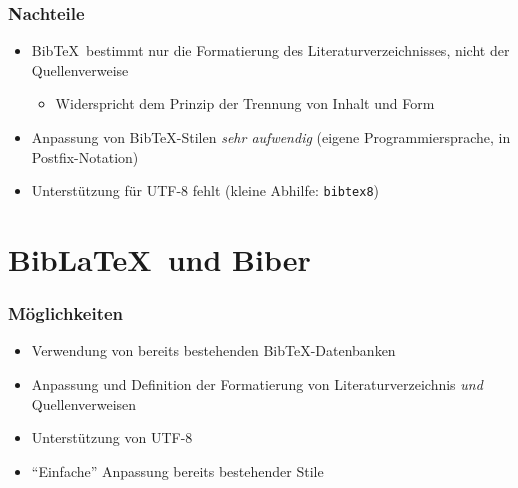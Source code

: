 \begin{frame}
  \frametitle{Nachteile}
  \onslide<+->

  \begin{itemize}
  \item<+-> Bib\TeX\ bestimmt nur die Formatierung des
    Literaturverzeichnisses, nicht der Quellenverweise
    \begin{itemize}
    \item<+-> Widerspricht dem Prinzip der Trennung von Inhalt und Form
    \end{itemize}
  \item<+-> Anpassung von Bib\TeX-Stilen \emph{sehr aufwendig} (eigene
    Programmiersprache, in Postfix-Notation)
  \item<+-> Unterstützung für UTF-8 fehlt (kleine Abhilfe: \texttt{bibtex8})
  \end{itemize}

\end{frame}

\section{Bib\LaTeX\ und Biber}

\begin{frame}
  \frametitle{Möglichkeiten}
  \onslide<+->

  \begin{itemize}
  \item<+-> Verwendung von bereits bestehenden Bib\TeX-Datenbanken
  \item<+-> Anpassung und Definition der Formatierung von Literaturverzeichnis
    \emph{und} Quellenverweisen
  \item<+-> Unterstützung von UTF-8
  \item<+-> \enquote{Einfache} Anpassung bereits bestehender Stile
  \end{itemize}

\end{frame}

